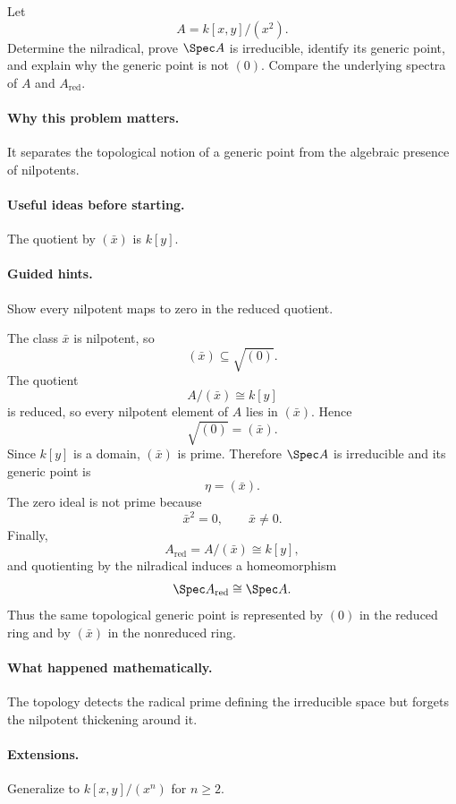 \begin{problem}
Let
\[
A=k[x,y]/(x^2).
\]
Determine the nilradical, prove $\Spec A$ is irreducible, identify its generic point, and
explain why the generic point is not $(0)$.  Compare the underlying spectra of $A$ and
$A_{\mathrm{red}}$.
\end{problem}

\paragraph{Why this problem matters.}
It separates the topological notion of a generic point from the algebraic presence of
nilpotents.

\paragraph{Useful ideas before starting.}
The quotient by $(\bar x)$ is $k[y]$.

\paragraph{Guided hints.}
Show every nilpotent maps to zero in the reduced quotient.

\begin{solution}
The class $\bar x$ is nilpotent, so
\[
(\bar x)\subseteq\sqrt{(0)}.
\]
The quotient
\[
A/(\bar x)\cong k[y]
\]
is reduced, so every nilpotent element of $A$ lies in $(\bar x)$.  Hence
\[
\sqrt{(0)}=(\bar x).
\]
Since $k[y]$ is a domain, $(\bar x)$ is prime.  Therefore $\Spec A$ is irreducible and its
generic point is
\[
\eta=(\bar x).
\]
The zero ideal is not prime because
\[
\bar x^2=0,\qquad \bar x\neq0.
\]
Finally,
\[
A_{\mathrm{red}}=A/(\bar x)\cong k[y],
\]
and quotienting by the nilradical induces a homeomorphism
\[
\Spec A_{\mathrm{red}}\cong\Spec A.
\]
Thus the same topological generic point is represented by $(0)$ in the reduced ring and by
$(\bar x)$ in the nonreduced ring.
\end{solution}

\paragraph{What happened mathematically.}
The topology detects the radical prime defining the irreducible space but forgets the
nilpotent thickening around it.

\paragraph{Extensions.}
Generalize to $k[x,y]/(x^n)$ for $n\ge2$.
